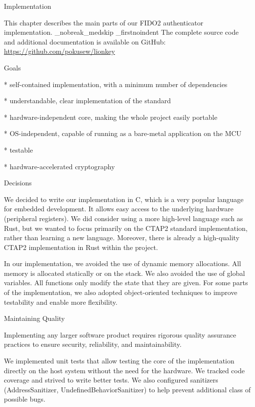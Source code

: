 \chap[implementation] Implementation

This chapter describes the main parts of our FIDO2 authenticator implementation.
\_nobreak\_medskip
\_firstnoindent
The complete source code and additional documentation is available on GitHub:\nl
\url{https://github.com/pokusew/lionkey}


\sec Goals

\begitems

* self-contained implementation, with {\sbf a minimum number of dependencies}

* understandable, clear implementation of the standard

* hardware-independent core, making the whole project easily portable

* OS-independent, capable of running as a bare-metal application on the MCU

* testable

* hardware-accelerated cryptography

\enditems


\sec Decisions

We decided to write our implementation in {\sbf C}, which is a very popular language for embedded development. It allows easy access to the underlying hardware (peripheral registers). We did consider using a more high-level language such as Rust, but we wanted to focus primarily on the CTAP2 standard implementation, rather than learning a new language. Moreover, there is already a high-quality CTAP2 implementation in Rust within the  project.

In our implementation, we avoided the use of dynamic memory allocations. All memory is allocated statically or on the stack. We also avoided the use of global variables. All functions only modify the state that they are given. For some parts of the implementation, we also adopted object-oriented techniques to improve testability and enable more flexibility.


\sec Maintaining Quality

Implementing any larger software product requires rigorous quality assurance practices to ensure security, reliability, and maintainability.

We implemented unit tests that allow testing the core of the implementation directly on the host system without the need for the hardware. We tracked code coverage and strived to write better tests. We also configured sanitizers (AddressSanitizer, UndefinedBehaviorSanitizer) to help prevent additional class of possible bugs.

